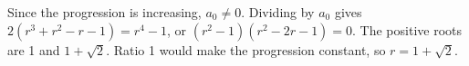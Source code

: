 Since the progression is increasing, $ a_0\ne0 $. Dividing by $ a_0 $ gives $ 2(r^3+r^2-r-1)=r^4-1 $, or $(r^2-1)(r^2-2r-1)=0 $. The positive roots are 1 and $ 1+\sqrt2 $. Ratio 1 would make the progression constant, so $\boxed{r=1+\sqrt2}$.
